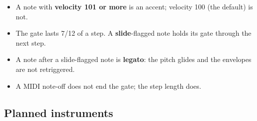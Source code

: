 \begin{itemize}
\tightlist
\item
  A note with \textbf{velocity 101 or more} is an accent; velocity 100
  (the default) is not.
\item
  The gate lasts 7/12 of a step. A \textbf{slide}-flagged note holds its
  gate through the next step.
\item
  A note after a slide-flagged note is \textbf{legato}: the pitch glides
  and the envelopes are not retriggered.
\item
  A MIDI note-off does not end the gate; the step length does.
\end{itemize}


\subsection{Planned instruments}\label{planned-instruments}

